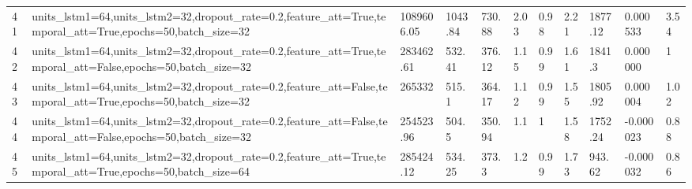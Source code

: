 \begin{longtable}{C{0.8cm} L{2cm} C{1.15cm} C{1.15cm} C{1.15cm} C{1.15cm} C{0.85cm} C{1.25cm} C{1.2cm} C{1.5cm} C{1.0cm}}
41 & units\_lstm1=64,\newline units\_lstm2=32,\newline dropout\_rate=0.2,\newline feature\_att=True,\newline temporal\_att=True,\newline epochs=50,\newline batch\_size=32 & 1089606.05 & 1043.84 & 730.88 & 2.03 & 0.98 & 2.21 & 1877.12 & 0.000533 & 3.54 \\
42 & units\_lstm1=64,\newline units\_lstm2=32,\newline dropout\_rate=0.2,\newline feature\_att=True,\newline temporal\_att=False,\newline epochs=50,\newline batch\_size=32 & 283462.61 & 532.41 & 376.12 & 1.15 & 0.99 & 1.61 & 1841.3 & 0.000000 & 1 \\
43 & units\_lstm1=64,\newline units\_lstm2=32,\newline dropout\_rate=0.2,\newline feature\_att=False,\newline temporal\_att=True,\newline epochs=50,\newline batch\_size=32 & 265332 & 515.1 & 364.17 & 1.12 & 0.99 & 1.55 & 1805.92 & 0.000004 & 1.02 \\
44 & units\_lstm1=64,\newline units\_lstm2=32,\newline dropout\_rate=0.2,\newline feature\_att=False,\newline temporal\_att=False,\newline epochs=50,\newline batch\_size=32 & 254523.96 & 504.5 & 350.94 & 1.1 & 1 & 1.58 & 1752.24 & -0.000023 & 0.88 \\
45 & units\_lstm1=64,\newline units\_lstm2=32,\newline dropout\_rate=0.2,\newline feature\_att=True,\newline temporal\_att=True,\newline epochs=50,\newline batch\_size=64 & 285424.12 & 534.25 & 373.3 & 1.2 & 0.99 & 1.73 & 943.62 & -0.000032 & 0.86 \\

\end{longtable}
